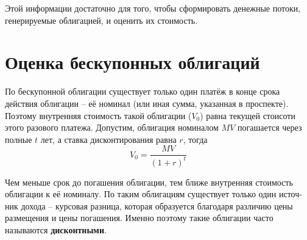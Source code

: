 Этой информации достаточно для того, чтобы сформировать денежные потоки, генерируемые облигацией, и оценить их стоимость.


\section{Оценка бескупонных облигаций}

По бескупонной облигации существует только один платёж в конце срока действия облигации – её номинал (или иная сумма, указанная в проспекте). Поэтому внутренняя стоимость такой облигации ($V_0$) равна текущей стоисоти этого разового платежа. Допустим, облигация номиналом $MV$ погашается через полные $t$ лет, а ставка дисконтирования равна $r$, тогда
\begin{equation}
 V_0 = \frac{MV}{(1+r)^t}
\end{equation}

Чем меньше срок до погашения облигации, тем ближе внутренняя стоимость облигации к её номиналу. По таким облигациям существует только один источ-ник дохода – курсовая разница, которая образуется благодаря различию цены размещения и цены погашения. Именно поэтому такие облигации часто называются {\bf дисконтными}.
